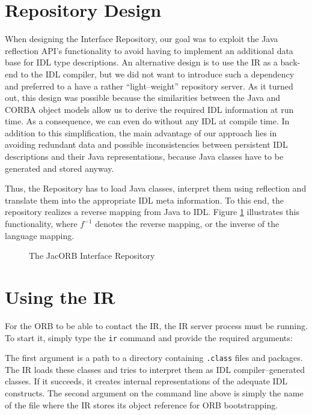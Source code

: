 \documentclass[12pt]{scrbook}
\begin{document}
\section{Repository Design}

When designing the  Interface Repository, our goal was  to exploit the
Java reflection  API's functionality to  avoid having to  implement an
additional data base for  IDL type descriptions. An alternative design
is to use the IR as a back-end to the IDL compiler, but we did not want
to  introduce such  a  dependency and  preferred  to a  have a  rather
``light--weight'' repository  server.  As  it turned out,  this design
was  possible because  the similarities  between the  Java  and CORBA
object models allow  us to derive the required  IDL information at run
time. As  a consequence,  we can  even do without  any IDL  at compile
time.  In addition  to this simplification, the main  advantage of our
approach lies in avoiding  redundant data and possible inconsistencies
between  persistent IDL descriptions  and their  Java representations,
because Java classes have to be generated and stored anyway.

Thus, the  Repository has to  load Java classes, interpret  them using
reflection  and   translate  them   into  the  appropriate   IDL  meta
information. To  this end, the  repository realizes a  reverse mapping
from   Java   to  IDL.   Figure   \ref{IR-Process}  illustrates   this
functionality,  where $f^{-1}$  denotes  the reverse  mapping, or  the
inverse of  the language  mapping.

\begin{figure}[htb]
\centerline{}
\caption{The JacORB Interface Repository}
\label{IR-Process}
\end{figure}

\section{Using the IR}

For the ORB to be able to contact the IR, the IR server process must
be running. To start it, simply type the {\tt ir} command and provide
the required arguments:


The first  argument is  a path to  a directory containing  {\tt .class}
files and packages. The IR  loads these classes and tries to interpret
them as  IDL compiler--generated classes.  If it  succeeds, it creates
internal representations  of the  adequate IDL constructs.  The second
argument on  the command  line above  is simply the  name of  the file
where the IR stores its object reference for ORB bootstrapping.
\end{document}

